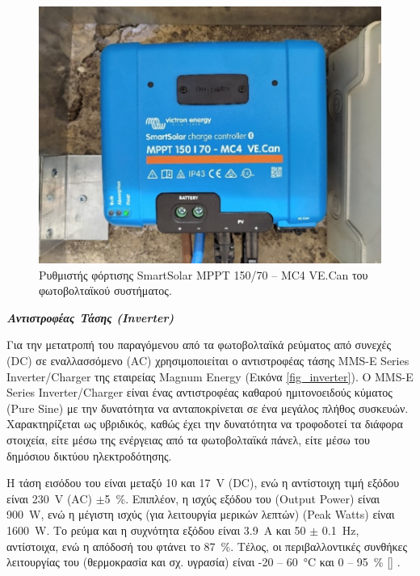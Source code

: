 \documentclass[12pt, a4paper]{report} %
\DeclareRobustCommand{\lcitep}[1]{%
  \english{[\cite{#1}]}%
}
\newcommand{\english}{\foreignlanguage{english}}
\begin{document}
\begin{figure}[ht]%
    \centering
    \includegraphics[scale=0.85]{Figures/solar_charger.jpg}
    \caption{Ρυθμιστής φόρτισης \english{SmartSolar MPPT 150/70 – MC4 VE.Can} του φωτοβολταϊκού συστήματος.}
    \label{fig_solar_charger}
\end{figure}

\pagebreak

\noindent \textit{\textbf{Αντιστροφέας Τάσης (\english{Inverter})}}

\vspace{0.2cm}

Για την μετατροπή του παραγόμενου από τα φωτοβολταϊκά ρεύματος από συνεχές (\english{DC}) σε εναλλασσόμενο (\english{AC}) 
χρησιμοποιείται ο αντιστροφέας τάσης \english{MMS-E Series Inverter/Charger} της εταιρείας \english{Magnum Energy} 
(Εικόνα \ref{fig_inverter}). Ο \english{MMS-E Series Inverter/Charger} είναι ένας αντιστροφέας καθαρού ημιτονοειδούς 
κύματος (\english{Pure Sine}) με την δυνατότητα να ανταποκρίνεται σε ένα μεγάλος πλήθος συσκευών. Χαρακτηρίζεται ως 
υβριδικός, καθώς έχει την δυνατότητα να τροφοδοτεί τα διάφορα στοιχεία, είτε μέσω της ενέργειας από τα φωτοβολταϊκά πάνελ, 
είτε μέσω του δημόσιου δικτύου ηλεκτροδότησης.

H τάση εισόδου του είναι μεταξύ 10 και \SI{17}{\volt} (\english{DC}), ενώ η αντίστοιχη τιμή εξόδου είναι \SI{230}{\volt} 
(\english{AC}) $\pm$\SI{5}{\percent}. Επιπλέον, η ισχύς εξόδου του (\english{Output Power}) είναι \SI{900}{\watt}, ενώ η 
μέγιστη ισχύς (για λειτουργία μερικών λεπτών) (\english{Peak Watts}) είναι \SI{1600}{\watt}. Το ρεύμα και η συχνότητα 
εξόδου είναι \SI{3,9}{\ampere} και 50 $\pm$ \SI{0,1}{\hertz}, αντίστοιχα, ενώ η απόδοσή του φτάνει το \SI{87}{\percent}. 
Τέλος, οι περιβαλλοντικές συνθήκες λειτουργίας του (θερμοκρασία και σχ. υγρασία) είναι -20 – \SI{60}{\degreeCelsius} και 
0 – \SI{95}{\percent} \lcitep{diataksi_bib8}.
\end{document}
